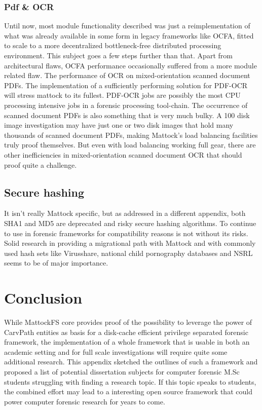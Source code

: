 \subsubsection{Pdf \& OCR}
Until now, most module functionality described was just a reimplementation of what was already available in some form in legacy frameworks like OCFA, fitted to scale to a more decentralized bottleneck-free distributed processing environment. This subject goes a few steps further than that. Apart from architectural flaws, OCFA performance occasionally suffered from a more module related flaw. The performance of OCR on mixed-orientation scanned document PDFs. The implementation of a sufficiently performing solution for PDF-OCR will stress mattock to its fullest. PDF-OCR jobs are possibly the most CPU processing intensive jobs in a forensic processing tool-chain. The occurrence of scanned document PDFs is also something that is very much bulky. A 100 disk image investigation may have just one or two disk images that hold many thousands of scanned document PDFs, making Mattock's load balancing facilities truly proof themselves. But even with load balancing working full gear, there are other inefficiencies in mixed-orientation scanned document OCR that should proof quite a challenge. 
\subsection{Secure hashing}
It isn't really Mattock specific, but as addressed in a different appendix, both SHA1 and MD5 are deprecated and risky secure hashing algorithms. To continue to use in forensic frameworks for compatibility reasons is not without its risks. Solid research in providing a migrational path with Mattock and with commonly used hash sets like Virusshare, national child pornography databases and NSRL seems to be of major importance.
\section{Conclusion}
While MattockFS core provides proof of the possibility to leverage the power of CarvPath entities as basis for a disk-cache efficient privilege separated forensic framework, the implementation of a whole framework that is usable in both an academic setting and for full scale investigations will require quite some additional research. This appendix sketched the outlines of such a framework and proposed a list of potential dissertation subjects for computer forensic M.Sc students struggling with finding a research topic. If this topic speaks to students, the combined effort may lead to a interesting open source framework that could power computer forensic research for years to come.

